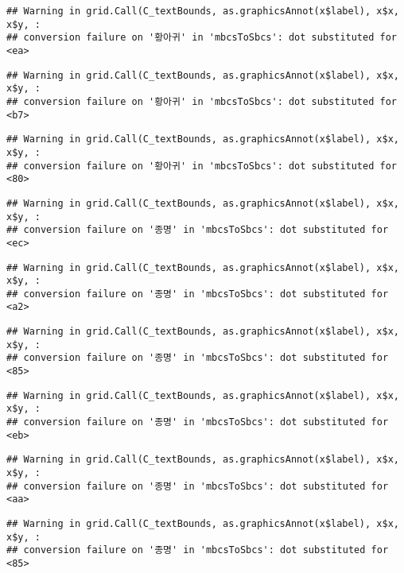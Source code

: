 \documentclass[
]{article}
\begin{document}
\begin{verbatim}
## Warning in grid.Call(C_textBounds, as.graphicsAnnot(x$label), x$x, x$y, :
## conversion failure on '황아귀' in 'mbcsToSbcs': dot substituted for <ea>
\end{verbatim}

\begin{verbatim}
## Warning in grid.Call(C_textBounds, as.graphicsAnnot(x$label), x$x, x$y, :
## conversion failure on '황아귀' in 'mbcsToSbcs': dot substituted for <b7>
\end{verbatim}

\begin{verbatim}
## Warning in grid.Call(C_textBounds, as.graphicsAnnot(x$label), x$x, x$y, :
## conversion failure on '황아귀' in 'mbcsToSbcs': dot substituted for <80>
\end{verbatim}

\begin{verbatim}
## Warning in grid.Call(C_textBounds, as.graphicsAnnot(x$label), x$x, x$y, :
## conversion failure on '종명' in 'mbcsToSbcs': dot substituted for <ec>
\end{verbatim}

\begin{verbatim}
## Warning in grid.Call(C_textBounds, as.graphicsAnnot(x$label), x$x, x$y, :
## conversion failure on '종명' in 'mbcsToSbcs': dot substituted for <a2>
\end{verbatim}

\begin{verbatim}
## Warning in grid.Call(C_textBounds, as.graphicsAnnot(x$label), x$x, x$y, :
## conversion failure on '종명' in 'mbcsToSbcs': dot substituted for <85>
\end{verbatim}

\begin{verbatim}
## Warning in grid.Call(C_textBounds, as.graphicsAnnot(x$label), x$x, x$y, :
## conversion failure on '종명' in 'mbcsToSbcs': dot substituted for <eb>
\end{verbatim}

\begin{verbatim}
## Warning in grid.Call(C_textBounds, as.graphicsAnnot(x$label), x$x, x$y, :
## conversion failure on '종명' in 'mbcsToSbcs': dot substituted for <aa>
\end{verbatim}

\begin{verbatim}
## Warning in grid.Call(C_textBounds, as.graphicsAnnot(x$label), x$x, x$y, :
## conversion failure on '종명' in 'mbcsToSbcs': dot substituted for <85>
\end{verbatim}
\end{document}
